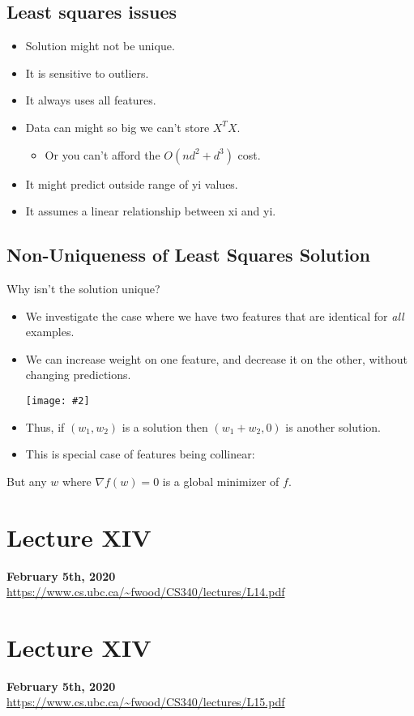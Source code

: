 \documentclass{article}
\def\blu#1{{\color{blu}#1}}
\def\gre#1{{\color{gre}#1}}
\def\red#1{{\color{red}#1}}
\theoremstyle{definition}
\newcommand{\centerfig}[2]{\begin{center}\texttt{[image: \#2]}\end{center}}
\begin{document}
\subsection*{Least squares issues}
\begin{itemize}
	\item Solution \red{might not be unique}.
	\item It is \red{sensitive to outliers}.
	\item It always \red{uses all features}.
	\item Data can might so big we \red{can’t store $ X^TX $}.
	\begin{itemize}
		\item Or you can’t afford the $ O(nd^2 + d^3) $ cost.
	\end{itemize}
	\item It might \red{predict outside range} of yi values.
	\item It assumes a \red{linear relationship} between xi and yi.
\end{itemize}
 \subsection*{Non-Uniqueness of Least Squares Solution}
Why isn't the solution unique?
\begin{itemize}
	\item We investigate the case where we have \gre{two features that are identical} for \textit{all} examples. 
	\item We can increase weight on one feature, and decrease it on the other, \red{without changing predictions}.
	\centerfig{0.6}{Pic1}
	\item Thus, if $ (w_1,w_2) $ is a solution then $ (w_1+w_2, 0) $ is another solution.
	\item This is special case of features being \blu{collinear}:
\end{itemize}
But any $ w $ where $ \nabla f(w)=0 $ is a global minimizer of $ f $.

\newpage

\section*{Lecture XIV}
\textbf{February 5th, 2020} \\
\url{https://www.cs.ubc.ca/~fwood/CS340/lectures/L14.pdf}

\newpage

\section*{Lecture XIV}
\textbf{February 5th, 2020} \\
\url{https://www.cs.ubc.ca/~fwood/CS340/lectures/L15.pdf}
\end{document}
